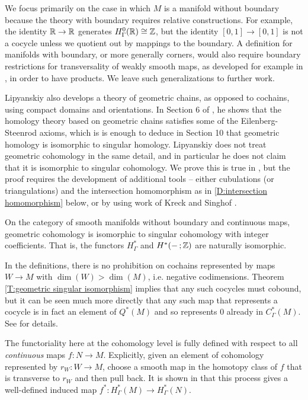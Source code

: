 We focus primarily on the case in which $M$ is a manifold without boundary because
the theory with boundary requires relative constructions.
For example, the identity $\mathbb{R}\to\mathbb{R}$ generates $H_\Gamma^0(\mathbb{R})\cong \mathbb{Z}$, but the identity $[0,1] \to [0,1]$ is not a cocycle unless we quotient out by mappings to the boundary.
A definition for manifolds with boundary, or more generally corners, would also require boundary restrictions for transversality of weakly smooth maps, as developed for example in \cite{Joy12}, in order to have products.
We leave such generalizations to further work.

Lipyanskiy also develops a theory of geometric chains, as opposed to cochains, using compact domains and orientations.
In Section 6 of \cite{Lipy14}, he shows that the homology theory based on geometric chains satisfies some of the Eilenberg-Steenrod axioms, which is is enough to deduce in Section 10 that geometric homology is isomorphic to singular homology.
Lipyanskiy does not treat geometric cohomology in the same detail, and in particular he does not claim that it is isomorphic to singular cohomology.
We prove this is true in \cite[Theorem 5.34 and Theorem 6.21]{medina2022foundations}, but the proof requires the development of additional tools -- either cubulations (or triangulations) and the
intersection homomorphism as in \cref{D:intersection homomorphism} below, or by using work of Kreck and Singhof \cite{Krec10, Krec10b}.

\begin{theorem}\label{T:geometric singular isomorphism}
	On the category of smooth manifolds without boundary and continuous maps, geometric cohomology is isomorphic to singular cohomology with integer coefficients.
	That is, the functors $H^*_\Gamma$ and $H^*(- \,;\mathbb{Z})$ are naturally isomorphic.
\end{theorem}

\begin{remark}
	In the definitions, there is no prohibition on cochains represented by maps $W \to M$ with $\dim(W) > \dim(M)$, i.e. negative codimensions.
	Theorem \cref{T:geometric singular isomorphism} implies that any such cocycles must cobound, but it can be seen much more directly that any such map that represents a cocycle is in fact an element of $Q^*(M)$ and so represents $0$ already in $C^*_\Gamma(M)$.
	See \cite[Example 4.23]{medina2022foundations} for details.
\end{remark}

The functoriality here at the cohomology level is fully defined with respect to all \textit{continuous} maps $f \colon N \to M$.
Explicitly, given an element of cohomology represented by $r_W \colon W \to M$, choose a smooth map in the homotopy class of $f$ that is transverse to $r_W$ and then pull back.
It is shown in \cite[Proposition 5.16]{medina2022foundations} that this process gives a well-defined induced map $f^* \colon H^*_\Gamma(M) \to H^*_\Gamma(N)$.

